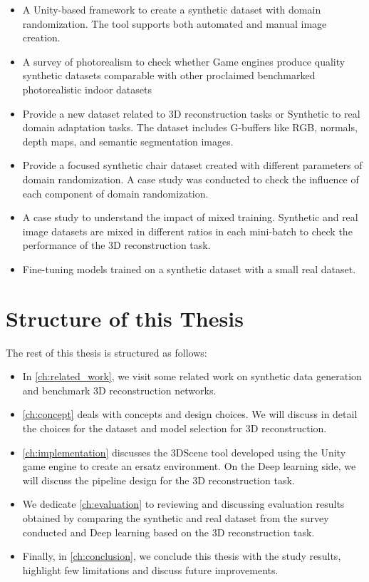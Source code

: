 \begin{itemize}
    \item A Unity-based framework to create a synthetic dataset with domain randomization.
    The tool supports both automated and manual image creation.
    \item A survey of photorealism to check whether Game engines produce quality synthetic datasets comparable with other proclaimed benchmarked photorealistic indoor datasets
    \item Provide a new dataset related to 3D reconstruction tasks or Synthetic to real domain adaptation tasks.
    The dataset includes G-buffers like RGB, normals, depth maps, and semantic segmentation images.
    \item Provide a focused synthetic chair dataset created with different parameters of domain randomization.
    A case study was conducted to check the influence of each component of domain randomization.
    \item A case study to understand the impact of mixed training.
    Synthetic and real image datasets are mixed in different ratios in each mini-batch to check the performance of the 3D reconstruction task.
    \item Fine-tuning models trained on a synthetic dataset with a small real dataset.
\end{itemize}


\section{Structure of this Thesis}\label{sec:Structure of thesis}

The rest of this thesis is structured as follows:

\begin{itemize}
    \item In \autoref{ch:related_work}, we visit some related work on synthetic data generation and benchmark 3D reconstruction networks.
    \item \autoref{ch:concept} deals with concepts and design choices.
    We will discuss in detail the choices for the dataset and model selection for 3D reconstruction.
    \item \autoref{ch:implementation} discusses the 3DScene tool developed using the Unity game engine to create an ersatz environment.
    On the Deep learning side, we will discuss the pipeline design for the 3D reconstruction task.
    \item We dedicate \autoref{ch:evaluation} to reviewing and discussing evaluation results obtained by comparing the synthetic and real dataset from the survey conducted and Deep learning based on the 3D reconstruction task.
    \item Finally, in \autoref{ch:conclusion}, we conclude this thesis with the study results, highlight few limitations and discuss future improvements.
\end{itemize}